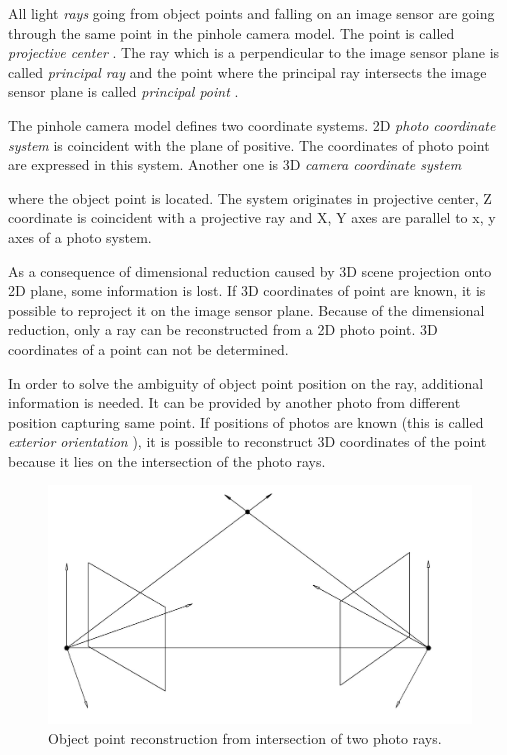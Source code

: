 \documentclass[a4paper,12pt]{article}
\newcommand{\term}[1]{%
{\it #1}%
}
\begin{document}


All light \term{rays} going from object points and falling on an image sensor are going through the same point in the pinhole camera model.
The point is called \term{projective center}. The ray which is a perpendicular to the image sensor plane is called \term{principal ray} and the point 
where the principal ray intersects the image sensor plane is called \term{principal point}.

The pinhole camera model defines two coordinate systems. 2D  \term{photo coordinate system} is coincident
with the plane of positive.
The coordinates of photo point are expressed in this system. Another one is 3D \term{camera coordinate system}
where the object point is located. The system originates in projective center, Z coordinate 
 is coincident with a projective ray and X, Y axes are parallel to x, y axes of a photo system.

 
As a consequence of dimensional reduction caused by 
3D scene projection onto 2D plane, some information is lost.
If 3D coordinates of point are known, it is possible to reproject it on the image sensor plane. Because 
of the dimensional reduction, only a ray can be reconstructed from a 2D photo point.
3D coordinates of a point can not be determined.

In order to solve the ambiguity of object point position on the ray, additional information is needed.  
It can be provided by another photo from different position capturing same point. 
If positions of photos 
 are known (this is called\term{ exterior orientation}), it is possible 
to reconstruct 3D coordinates of the point because it lies on the intersection of the photo rays.


\begin{figure}[h]
    \centering
    \includegraphics[scale=0.2]{figures/ray_intersection.png}
    \caption{Object point reconstruction from intersection of two photo rays.}
    \label{fig:obj_intersec}
\end{figure}
\end{document}

